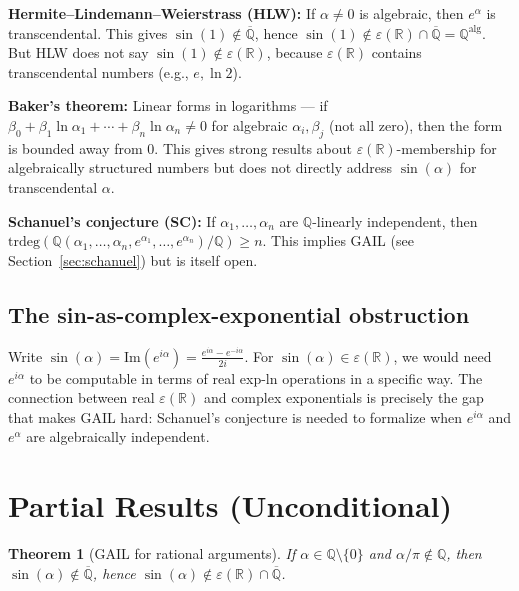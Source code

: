 \documentclass[11pt]{article}
\newtheorem{theorem}{Theorem}
\begin{document}
\textbf{Hermite--Lindemann--Weierstrass (HLW):} If $\alpha \neq 0$ is algebraic,
then $e^\alpha$ is transcendental. This gives $\sin(1) \notin \overline{\mathbb{Q}}$,
hence $\sin(1) \notin \varepsilon(\mathbb{R}) \cap \overline{\mathbb{Q}} = \mathbb{Q}^{\mathrm{alg}}$.
But HLW does not say $\sin(1) \notin \varepsilon(\mathbb{R})$, because $\varepsilon(\mathbb{R})$
contains transcendental numbers (e.g., $e, \ln 2$).

\textbf{Baker's theorem:} Linear forms in logarithms — if
$\beta_0 + \beta_1 \ln \alpha_1 + \cdots + \beta_n \ln \alpha_n \neq 0$
for algebraic $\alpha_i, \beta_j$ (not all zero), then the form is bounded away from 0.
This gives strong results about $\varepsilon(\mathbb{R})$-membership for algebraically
structured numbers but does not directly address $\sin(\alpha)$ for transcendental $\alpha$.

\textbf{Schanuel's conjecture (SC):} If $\alpha_1, \ldots, \alpha_n$ are
$\mathbb{Q}$-linearly independent, then
$\mathrm{trdeg}(\mathbb{Q}(\alpha_1, \ldots, \alpha_n, e^{\alpha_1}, \ldots, e^{\alpha_n})/\mathbb{Q}) \geq n$.
This implies GAIL (see Section~\ref{sec:schanuel}) but is itself open.

\subsection{The sin-as-complex-exponential obstruction}

Write $\sin(\alpha) = \mathrm{Im}(e^{i\alpha}) = \frac{e^{i\alpha} - e^{-i\alpha}}{2i}$.
For $\sin(\alpha) \in \varepsilon(\mathbb{R})$, we would need $e^{i\alpha}$
to be computable in terms of real exp-ln operations in a specific way.
The connection between real $\varepsilon(\mathbb{R})$ and complex exponentials is
precisely the gap that makes GAIL hard: Schanuel's conjecture is needed to
formalize when $e^{i\alpha}$ and $e^\alpha$ are algebraically independent.

\section{Partial Results (Unconditional)}

\begin{theorem}[GAIL for rational arguments]
\label{thm:gail_rational}
If $\alpha \in \mathbb{Q} \setminus \{0\}$ and $\alpha/\pi \notin \mathbb{Q}$,
then $\sin(\alpha) \notin \overline{\mathbb{Q}}$, hence $\sin(\alpha) \notin
\varepsilon(\mathbb{R}) \cap \overline{\mathbb{Q}}$.
\end{theorem}
\end{document}
